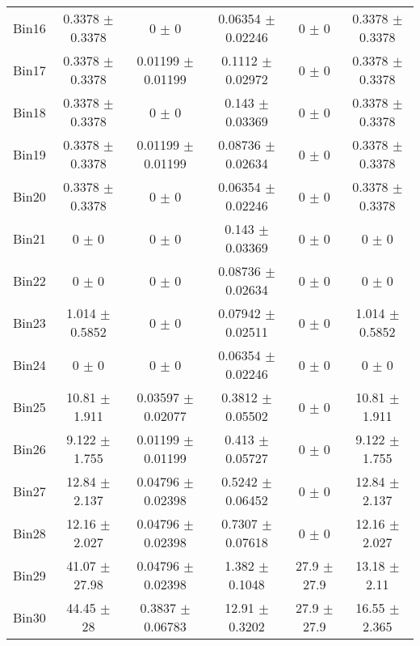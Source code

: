 \begin{tabular}{@{\extracolsep{4pt}}lccccc@{}}
     Bin16 & 0.3378 $\pm$ 0.3378 & 0 $\pm$ 0 & 0.06354 $\pm$ 0.02246 & 0 $\pm$ 0 & 0.3378 $\pm$ 0.3378 \\ 
     Bin17 & 0.3378 $\pm$ 0.3378 & 0.01199 $\pm$ 0.01199 & 0.1112 $\pm$ 0.02972 & 0 $\pm$ 0 & 0.3378 $\pm$ 0.3378 \\ 
     Bin18 & 0.3378 $\pm$ 0.3378 & 0 $\pm$ 0 & 0.143 $\pm$ 0.03369 & 0 $\pm$ 0 & 0.3378 $\pm$ 0.3378 \\ 
     Bin19 & 0.3378 $\pm$ 0.3378 & 0.01199 $\pm$ 0.01199 & 0.08736 $\pm$ 0.02634 & 0 $\pm$ 0 & 0.3378 $\pm$ 0.3378 \\ 
     Bin20 & 0.3378 $\pm$ 0.3378 & 0 $\pm$ 0 & 0.06354 $\pm$ 0.02246 & 0 $\pm$ 0 & 0.3378 $\pm$ 0.3378 \\ 
     Bin21 & 0 $\pm$ 0 & 0 $\pm$ 0 & 0.143 $\pm$ 0.03369 & 0 $\pm$ 0 & 0 $\pm$ 0 \\ 
     Bin22 & 0 $\pm$ 0 & 0 $\pm$ 0 & 0.08736 $\pm$ 0.02634 & 0 $\pm$ 0 & 0 $\pm$ 0 \\ 
     Bin23 & 1.014 $\pm$ 0.5852 & 0 $\pm$ 0 & 0.07942 $\pm$ 0.02511 & 0 $\pm$ 0 & 1.014 $\pm$ 0.5852 \\ 
     Bin24 & 0 $\pm$ 0 & 0 $\pm$ 0 & 0.06354 $\pm$ 0.02246 & 0 $\pm$ 0 & 0 $\pm$ 0 \\ 
     Bin25 & 10.81 $\pm$ 1.911 & 0.03597 $\pm$ 0.02077 & 0.3812 $\pm$ 0.05502 & 0 $\pm$ 0 & 10.81 $\pm$ 1.911 \\ 
     Bin26 & 9.122 $\pm$ 1.755 & 0.01199 $\pm$ 0.01199 & 0.413 $\pm$ 0.05727 & 0 $\pm$ 0 & 9.122 $\pm$ 1.755 \\ 
     Bin27 & 12.84 $\pm$ 2.137 & 0.04796 $\pm$ 0.02398 & 0.5242 $\pm$ 0.06452 & 0 $\pm$ 0 & 12.84 $\pm$ 2.137 \\ 
     Bin28 & 12.16 $\pm$ 2.027 & 0.04796 $\pm$ 0.02398 & 0.7307 $\pm$ 0.07618 & 0 $\pm$ 0 & 12.16 $\pm$ 2.027 \\ 
     Bin29 & 41.07 $\pm$ 27.98 & 0.04796 $\pm$ 0.02398 & 1.382 $\pm$ 0.1048 & 27.9 $\pm$ 27.9 & 13.18 $\pm$ 2.11 \\ 
     Bin30 & 44.45 $\pm$ 28 & 0.3837 $\pm$ 0.06783 & 12.91 $\pm$ 0.3202 & 27.9 $\pm$ 27.9 & 16.55 $\pm$ 2.365 \\ 
\hline\hline
  \end{tabular}
